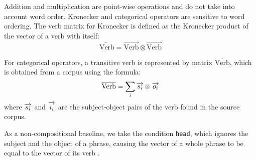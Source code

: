 Addition and multiplication are point-wise operations and do not take into account word order. Kronecker and categorical operators are sensitive to word ordering. The verb matrix for Kronecker is defined as the Kronecker product of the vector of a verb with itself:
%
\begin{equation*}
  \widetilde{\text{Verb}} = \overrightarrow{\text{Verb}} \otimes \overrightarrow{\text{Verb}}
\end{equation*}

For categorical operators, a transitive verb is represented by matrix $\overline{\text{Verb}}$, which is obtained from a corpus using the formula:
$$
\overline{\text{Verb}} = \sum_i\overrightarrow{s_i} \otimes \overrightarrow{o_i}
$$
where $\overrightarrow{s_i}$ and $\overrightarrow{i_i}$ are the subject-object pairs of the verb found in the source corpus.

As a non-compositional baseline, we take the condition \texttt{head}, which ignores the subject and the object of a phrase, causing the vector of a whole phrase to be equal to the vector of its verb \cite{milajevs-EtAl:2014:EMNLP2014}.


